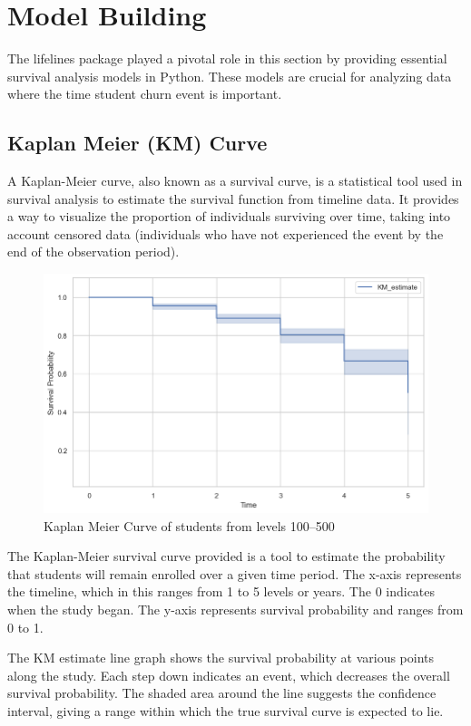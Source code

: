 \documentclass[doublespacing]{report} %
\begin{document}
\section{Model Building}

The lifelines package played a pivotal role in this section by providing essential survival analysis models in Python. These models are crucial for analyzing data where the time student churn event is important. 


\subsection{Kaplan Meier (KM) Curve}

A Kaplan-Meier curve, also known as a survival curve, is a statistical tool used in survival analysis to estimate the survival function from timeline data. It provides a way to visualize the proportion of individuals surviving over time, taking into account censored data (individuals who have not experienced the event by the end of the observation period).
\begin{figure}[H]
    \centering
    \includegraphics[width=1\linewidth]{Figure 4/4.1.png}
    \caption{Kaplan Meier Curve of students from levels 100–500}
\end{figure}

The Kaplan-Meier survival curve provided is a tool to estimate the probability that students will remain enrolled over a given time period. The x-axis represents the timeline, which in this ranges from 1 to 5 levels or years. The 0 indicates when the study began. The y-axis represents survival probability and ranges from 0 to 1.


The KM estimate line graph shows the survival probability at various points along the study. Each step down indicates an event, which decreases the overall survival probability. The shaded area around the line suggests the confidence interval, giving a range within which the true survival curve is expected to lie.
\end{document}
